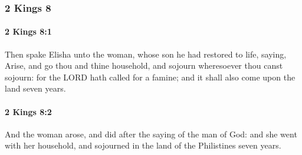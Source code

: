 	\subsubsection{2 Kings 8} %
		\label{2KINGS-8}

		\paragraph{2 Kings 8:1} %
			\label{2KINGS-8-1}

			Then spake Elisha unto the woman, whose son he had restored to life, saying, Arise, and go thou and thine household, and sojourn wheresoever thou canst sojourn: for the LORD hath called for a famine; and it shall also come upon the land seven years.


		\paragraph{2 Kings 8:2} %
			\label{2KINGS-8-2}

			And the woman arose, and did after the saying of the man of God: and she went with her household, and sojourned in the land of the Philistines seven years.

